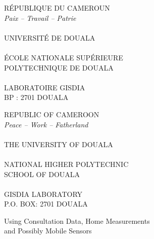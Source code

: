 \documentclass[11pt,a4paper,oneside]{report}
\begin{document}
\begin{titlepage}
\singlespacing
\color{tpNavy}
\noindent\begin{minipage}[t]{0.44\textwidth}\centering
{}
\end{minipage}\hfill
\begin{minipage}[t]{0.44\textwidth}\centering
{}
\end{minipage}

\vspace{0.25cm}
{\scriptsize\bfseries
\noindent\begin{minipage}[t]{0.44\textwidth}\centering
RÉPUBLIQUE DU CAMEROUN\\ {\mdseries\itshape Paix -- Travail -- Patrie}\\ \tpsep\\
UNIVERSITÉ DE DOUALA\\ \tpsep\\
ÉCOLE NATIONALE SUPÉRIEURE\\ POLYTECHNIQUE DE DOUALA\\ \tpsep\\
LABORATOIRE GISDIA\\ BP : 2701 DOUALA
\end{minipage}\hfill
\begin{minipage}[t]{0.44\textwidth}\centering
REPUBLIC OF CAMEROON\\ {\mdseries\itshape Peace -- Work -- Fatherland}\\ \tpsep\\
THE UNIVERSITY OF DOUALA\\ \tpsep\\
NATIONAL HIGHER POLYTECHNIC\\ SCHOOL OF DOUALA\\ \tpsep\\
GISDIA LABORATORY\\ P.O. BOX: 2701 DOUALA
\end{minipage}\par}

\vspace{0.8cm}
\begin{center}
{\setlength{\fboxsep}{9pt}\par}

\vspace{0.6cm}
{\large\color{tpBlue} Using Consultation Data, Home Measurements\\ and Possibly Mobile Sensors\par}


\end{center}
\end{titlepage}
\end{document}
